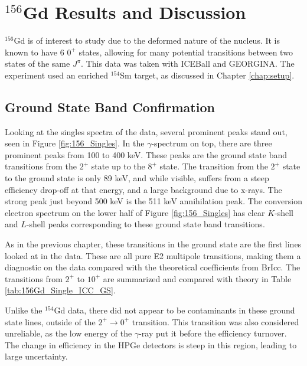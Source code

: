 \chapter{$^{156}$Gd Results and Discussion}

$^{156}$Gd is of interest to study due to the deformed nature of the nucleus. It is known to have 6 $0^+$ states, allowing for many potential transitions between two states of the same $J^\pi$. This data was taken with ICEBall and GEORGINA. The experiment used an enriched $^{154}$Sm target, as discussed in Chapter \ref{chap:setup}.

\section{Ground State Band Confirmation}

Looking at the singles spectra of the data, several prominent peaks stand out, seen in Figure \ref{fig:156_Singles}. In the $\gamma$-spectrum on top, there are three prominent peaks from 100 to 400 keV. These peaks are the ground state band transitions from the $2^+$ state up to the $8^+$ state. The transition from the $2^+$ state to the ground state is only 89 keV, and while visible, suffers from a steep efficiency drop-off at that energy, and a large background due to x-rays. The strong peak just beyond 500 keV is the 511 keV annihilation peak. The conversion electron spectrum on the lower half of Figure \ref{fig:156_Singles} has clear $K$-shell and $L$-shell peaks corresponding to these ground state band transitions. 



As in the previous chapter, these transitions in the ground state are the first lines looked at in the data. These are all pure E2 multipole transitions, making them a diagnostic on the data compared with the theoretical coefficients from BrIcc\citep{kibedi08:_BRICC}. The transitions from $2^+$ to $10^+$ are summarized and compared with theory in Table \ref{tab:156Gd_Single_ICC_GS}.



Unlike the $^{154}$Gd data, there did not appear to be contaminants in these ground state lines, outside of the $2^+\rightarrow0^+$ transition. This transition was also considered unreliable, as the low energy of the $\gamma$-ray put it before the efficiency turnover. The change in efficiency in the HPGe detectors is steep in this region, leading to large uncertainty.

